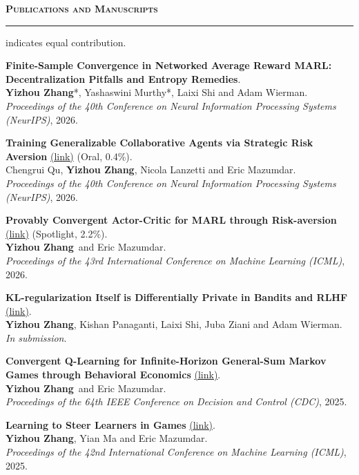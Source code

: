 \documentclass[11pt]{article}
\newcommand{\Me}{\textbf{Yizhou Zhang}}
\newcommand{\Section}[1]{%
  \vspace{0.9\baselineskip}%
  {\large\bfseries\scshape #1}\\[-0.35\baselineskip]
  \rule{\linewidth}{0.4pt}\vspace{0.35\baselineskip}%
}
\begin{document}
\Section{Publications and Manuscripts}
{\fontsize{8}{8.8}\selectfont * indicates equal contribution.\par}
\begin{publist}
\item \textbf{Finite-Sample Convergence in Networked Average Reward MARL: Decentralization Pitfalls and Entropy Remedies}.\\
\Me*, Yashaswini Murthy*, Laixi Shi and Adam Wierman.\\
\textit{Proceedings of the 40th Conference on Neural Information Processing Systems (NeurIPS)}, 2026.

\item \textbf{Training Generalizable Collaborative Agents via Strategic Risk Aversion} \href{http://arxiv.org/abs/2602.21515}{(link)} {\textcolor{SpotlightRed}{(Oral, 0.4\%)}}.\\
Chengrui Qu, \Me, Nicola Lanzetti and Eric Mazumdar.\\
\textit{Proceedings of the 40th Conference on Neural Information Processing Systems (NeurIPS)}, 2026.

\item \textbf{Provably Convergent Actor-Critic for MARL through Risk-aversion} \href{https://arxiv.org/abs/2602.12386}{(link)} {\textcolor{SpotlightRed}{(Spotlight, 2.2\%)}}.\\
\Me \ and Eric Mazumdar.\\
\textit{Proceedings of the 43rd International Conference on Machine Learning (ICML)}, 2026.

\item \textbf{KL-regularization Itself is Differentially Private in Bandits and RLHF} \href{https://www.arxiv.org/abs/2505.18407}{(link)}.\\
\Me, Kishan Panaganti, Laixi Shi, Juba Ziani and Adam Wierman.\\
\textit{In submission}.

\item \textbf{Convergent Q-Learning for Infinite-Horizon General-Sum Markov Games through Behavioral Economics} \href{https://ieeexplore.ieee.org/stamp/stamp.jsp?arnumber=11312619}{(link)}.\\
\Me \ and Eric Mazumdar.\\
\textit{Proceedings of the 64th IEEE Conference on Decision and Control (CDC)}, 2025.

\item \textbf{Learning to Steer Learners in Games} \href{https://arxiv.org/abs/2502.20770}{(link)}.\\
\Me, Yian Ma and Eric Mazumdar.\\
\textit{Proceedings of the 42nd International Conference on Machine Learning (ICML)}, 2025.


\end{publist}
\end{document}
